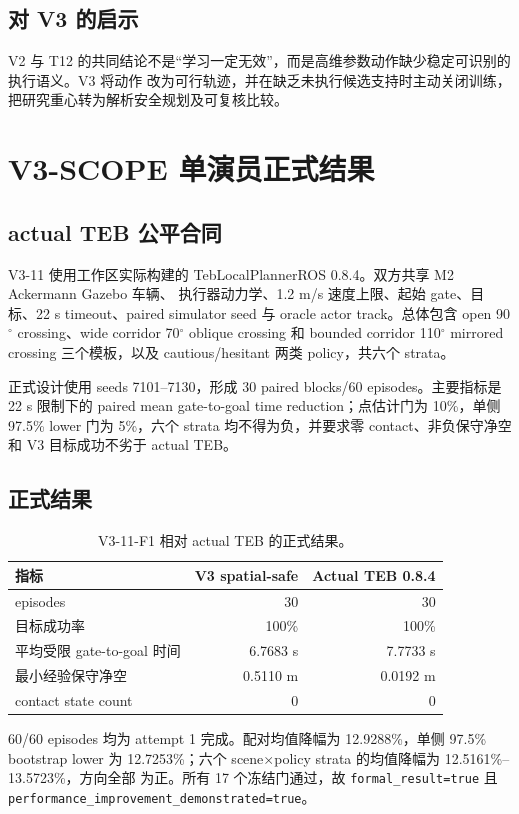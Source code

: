 \documentclass[12pt,a4paper,oneside]{report}
\newcommand{\code}[1]{\texttt{#1}}
\begin{document}
\section{对 V3 的启示}
V2 与 T12 的共同结论不是“学习一定无效”，而是高维参数动作缺少稳定可识别的执行语义。V3 将动作
改为可行轨迹，并在缺乏未执行候选支持时主动关闭训练，把研究重心转为解析安全规划及可复核比较。

\chapter{V3-SCOPE 单演员正式结果}
\section{actual TEB 公平合同}
V3-11 使用工作区实际构建的 TebLocalPlannerROS 0.8.4。双方共享 M2 Ackermann Gazebo 车辆、
执行器动力学、1.2 m/s 速度上限、起始 gate、目标、22 s timeout、paired simulator seed 与
oracle actor track。总体包含 open 90$^\circ$ crossing、wide corridor 70$^\circ$ oblique
crossing 和 bounded corridor 110$^\circ$ mirrored crossing 三个模板，以及 cautious/hesitant
两类 policy，共六个 strata。

正式设计使用 seeds 7101--7130，形成 30 paired blocks/60 episodes。主要指标是 22 s 限制下的
paired mean gate-to-goal time reduction；点估计门为 10\%，单侧 97.5\% lower 门为 5\%，六个
strata 均不得为负，并要求零 contact、非负保守净空和 V3 目标成功不劣于 actual TEB。

\section{正式结果}
\begin{table}[htbp]
\centering
\caption{V3-11-F1 相对 actual TEB 的正式结果。}
\begin{tabular}{lrr}
\toprule
指标 & V3 spatial-safe & Actual TEB 0.8.4\\
\midrule
episodes & 30 & 30\\
目标成功率 & 100\% & 100\%\\
平均受限 gate-to-goal 时间 & 6.7683 s & 7.7733 s\\
最小经验保守净空 & 0.5110 m & 0.0192 m\\
contact state count & 0 & 0\\
\bottomrule
\end{tabular}
\label{tab:v311}
\end{table}

60/60 episodes 均为 attempt 1 完成。配对均值降幅为 12.9288\%，单侧 97.5\% bootstrap lower
为 12.7253\%；六个 scene$\times$policy strata 的均值降幅为 12.5161\%--13.5723\%，方向全部
为正。所有 17 个冻结门通过，故
\code{formal\_result=true} 且 \code{performance\_improvement\_demonstrated=true}。
\end{document}
